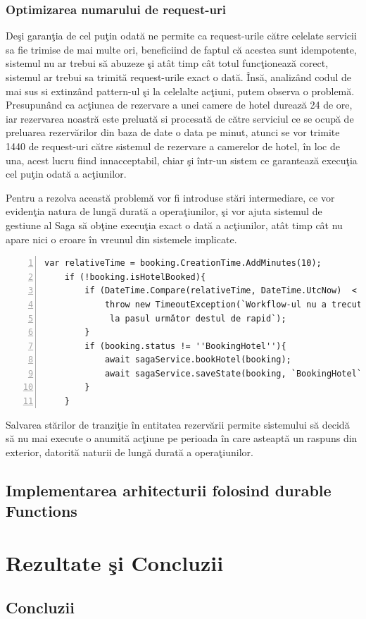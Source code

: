 \documentclass[a4paper,12pt]{report}
\begin{document}
\subsection{Optimizarea numarului de request-uri}
 \par Deşi garanţia de cel puţin odată ne permite ca request-urile către celelate servicii sa fie trimise de mai multe ori, beneficiind de faptul că acestea sunt idempotente, sistemul nu ar trebui să abuzeze şi atât timp cât totul funcţionează corect, sistemul ar trebui sa trimită request-urile exact o dată. Însă, analizând codul de mai sus si extinzând pattern-ul şi la celelalte acţiuni, putem observa o problemă. Presupunând ca acţiunea de rezervare a unei camere de hotel durează 24 de ore, iar rezervarea noastră este preluată si procesată de către serviciul ce se ocupă de preluarea rezervărilor din baza de date o data pe minut, atunci se vor trimite 1440 de request-uri către sistemul de rezervare a camerelor de hotel, în loc de una, acest lucru fiind innacceptabil, chiar şi într-un sistem ce garantează execuţia cel puţin odată a acţiunilor. 
 \par Pentru a rezolva această problemă vor fi introduse stări intermediare, ce vor evidenţia natura de lungă durată a operaţiunilor, şi vor ajuta sistemul de gestiune al Saga să obţine execuţia exact o dată a acţiunilor, atât timp cât nu apare nici o eroare în vreunul din sistemele implicate. 
 \begin{Verbatim}[numbers=left]
	var relativeTime = booking.CreationTime.AddMinutes(10);
	if (!booking.isHotelBooked){
		if (DateTime.Compare(relativeTime, DateTime.UtcNow)  < 0 ){
			throw new TimeoutException(`Workflow-ul nu a trecut
			 la pasul următor destul de rapid`);
		}
		if (booking.status != ''BookingHotel''){
			await sagaService.bookHotel(booking);
			await sagaService.saveState(booking, `BookingHotel`);
		}
	}
\end{Verbatim}
\par Salvarea stărilor de tranziţie în entitatea rezervării permite sistemului să decidă să nu mai execute o anumită acţiune pe perioada în care asteaptă un raspuns din exterior, datorită naturii de lungă durată a operaţiunilor.
\section{Implementarea arhitecturii folosind durable Functions}
\chapter {Rezultate şi Concluzii}

\section{Concluzii}


\listoffigures
\listoftables

\end{document}
